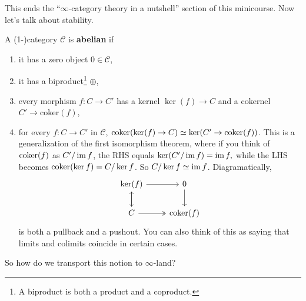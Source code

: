 \orbreak
This ends the ``$\infty$-category theory in a nutshell'' section of this minicourse. Now let's talk about stability.
\begin{definition}[]
    A (1-)category $\mathcal{C} $ is \textbf{abelian} if
    \begin{enumerate}[label=(\roman*)]
    \setlength\itemsep{-.2em}
        \item it has a zero object $0 \in \mathcal{C} $,
        \item it has a biproduct\footnote{A biproduct is both a product and a coproduct.} $\oplus$,
        \item every morphism $f \colon C \to C'$ has a kernel $\ker (f) \to C$ and a cokernel $C' \to \mathrm{coker}(f)$,
        \item for every $f \colon C \to C'$ in $\mathcal{C} $, $\operatorname{coker} (\ker (f) \to C)\simeq \ker(C' \to \operatorname{coker} (f))$. This is a generalization of the first isomorphism theorem, where if you think of $\operatorname{coker}(f)$ as $C' /\operatorname{im} f$, the RHS equals $\ker(C' / \operatorname{im} f)=\operatorname{im} f,$ while the LHS becomes $\operatorname{coker}(\ker f)= C /\ker f$. So $C /\ker f\simeq \operatorname{im} f$. Diagramatically, \[
        \begin{tikzcd}
\ker(f) \arrow[d] \arrow[r]      & 0 \arrow[d] \\
C \arrow[r, two heads] \arrow[u] & \coker(f)  
\end{tikzcd}
        \] is both a pullback and a pushout. You can also think of this as saying that limits and colimits coincide in certain cases.
    \end{enumerate}
\end{definition}
So how do we transport this notion to $\infty$-land?
